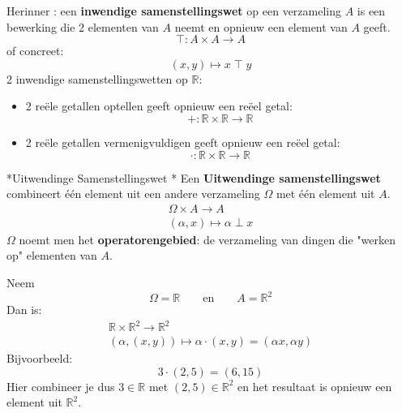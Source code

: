 Herinner : een \textbf{inwendige samenstellingswet} op een verzameling $A$ is een bewerking die 2 elementen van $A$ neemt en opnieuw een element van $A$ geeft.
\begin{equation*}
    \top : A \times A \to A
\end{equation*}
of concreet:
\begin{equation*}
    (x,y) \mapsto x\; \top\; y
\end{equation*}
\textbf{} 2 inwendige samenstellingswetten op $\mathbb{R}$:
\begin{itemize}
    \item 2 reële getallen optellen geeft opnieuw een reëel getal:
    \begin{equation*}
        + : \mathbb{R} \times \mathbb{R} \to \mathbb{R}
    \end{equation*}
    \item 2 reële getallen vermenigvuldigen geeft opnieuw een reëel getal:
    \begin{equation*}
        \cdot : \mathbb{R} \times \mathbb{R} \to \mathbb{R}
    \end{equation*}
\end{itemize}

\begin{nicedefinition}*{Uitwendinge Samenstellingswet}
    \nextpart[]*
    Een \textcolor{PineGreen!75!black}{\textbf{Uitwendinge samenstellingswet}} combineert één element uit een andere verzameling $\Omega$ met één element uit $A$.
    \begin{equation*}
        \begin{gathered}
            \Omega \times A \to A \\
            (\alpha, x) \mapsto \alpha \perp x
        \end{gathered}
    \end{equation*}
    $\Omega$ noemt men het \textbf{operatorengebied}: de verzameling van dingen die "werken op" elementen van $A$.
\end{nicedefinition}

\textbf{} Neem
\begin{equation*}
    \Omega = \mathbb{R} \qquad \text{en} \qquad A = \mathbb{R}^2
\end{equation*}
Dan is:
\begin{equation*}
    \begin{gathered}
        \mathbb{R} \times \mathbb{R}^2 \to \mathbb{R}^2 \\
        (\alpha, (x,y)) \mapsto \alpha \cdot (x,y) = (\alpha x, \alpha y)
    \end{gathered}
\end{equation*}
Bijvoorbeeld:
\begin{equation*}
    3 \cdot (2,5) = (6, 15)
\end{equation*}
Hier combineer je dus $3 \in \mathbb{R}$ met $(2,5) \in \mathbb{R}^2$ en het resultaat is opnieuw een element uit $\mathbb{R}^2$.

